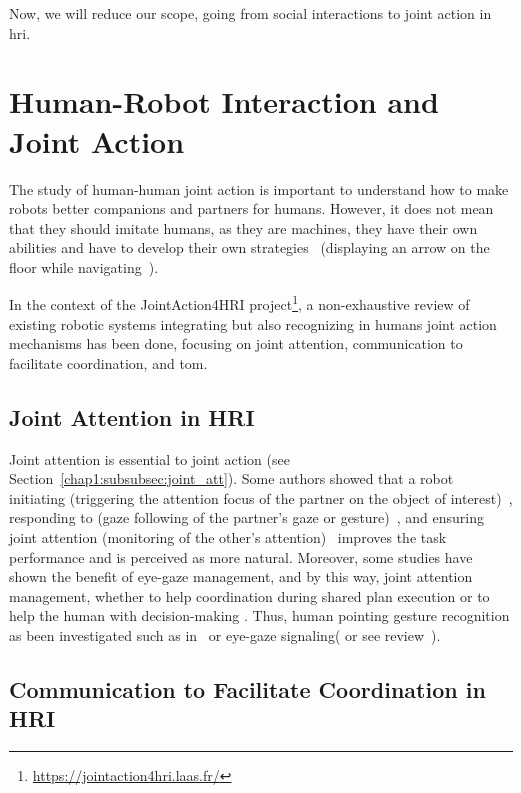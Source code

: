 \documentclass[a4paper,11pt,twoside]{StyleThese}
\begin{document}
Now, we will reduce our scope, going from social interactions to joint action in \acrshort{hri}. 

\section{Human-Robot Interaction and Joint Action}\label{chap2:sec:hri_ja}
The study of human-human joint action is important to understand how to make robots better companions and partners for humans. However, it does not mean that they should imitate humans, as they are machines, they have their own abilities and have to develop their own strategies~\citep{bradshaw_2017_human} (\eg displaying an arrow on the floor while navigating~\citep{chadalavada_2015_mind, coovert_2014_spatial}).

In the context of the JointAction4HRI project\footnote{\url{https://jointaction4hri.laas.fr/}}, a non-exhaustive review of existing robotic systems integrating but also recognizing in humans joint action mechanisms has been done, focusing on joint attention, communication to facilitate coordination, and \acrlong{tom}.

\subsection{Joint Attention in HRI}
Joint attention is essential to joint action (see Section~\ref{chap1:subsubsec:joint_att}). Some authors showed that a robot initiating (\ie triggering the attention focus of the partner on the object of interest)~\citep{imai_2003_physical}, responding to (\ie gaze following of the partner's gaze or gesture)~\citep{yu_2010_investigating}, and ensuring joint attention (\ie monitoring of the other's attention)~\citep{huang_2010_joint} improves the task performance and is perceived as more natural. Moreover, some studies have shown the benefit of eye-gaze management, and by this way, joint attention management, whether to help coordination during shared plan execution \citep{lallee_2013_cooperative} or to help the human with decision-making \citep{boucher_2010_facilitation, boucher_2012_reach}. Thus, human pointing gesture recognition as been investigated such as in~\citep{nickel_2007_visual} or eye-gaze signaling(\eg \citep{staudte_2009_visual} or see review~\citep{admoni_2017_social}).

\subsection{Communication to Facilitate Coordination in HRI}
\end{document}
